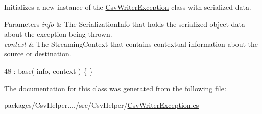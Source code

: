 Initializes a new instance of the \hyperlink{a00062}{Csv\-Writer\-Exception} class with serialized data. 


\begin{DoxyParams}{Parameters}
{\em info} & The Serialization\-Info that holds the serialized object data about the exception being thrown.\\
\hline
{\em context} & The Streaming\-Context that contains contextual information about the source or destination.\\
\hline
\end{DoxyParams}

\begin{DoxyCode}
48 : base( info, context ) \{ \}
\end{DoxyCode}


The documentation for this class was generated from the following file\-:\begin{DoxyCompactItemize}
\item 
packages/\-Csv\-Helper..../src/\-Csv\-Helper/\hyperlink{a00207}{Csv\-Writer\-Exception.\-cs}\end{DoxyCompactItemize}
